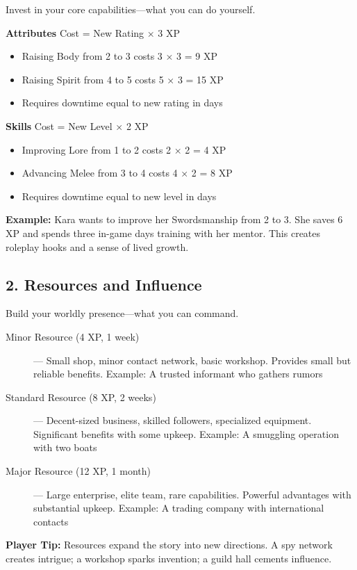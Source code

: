 \documentclass[11pt,twoside,openany]{book}
\begin{document}
Invest in your core capabilities—what you can do yourself.

\textbf{Attributes} Cost = New Rating × 3 XP
\begin{itemize}
\item Raising Body from 2 to 3 costs 3 × 3 = 9 XP
\item Raising Spirit from 4 to 5 costs 5 × 3 = 15 XP
\item Requires downtime equal to new rating in days
\end{itemize}

\textbf{Skills} Cost = New Level × 2 XP
\begin{itemize}
\item Improving Lore from 1 to 2 costs 2 × 2 = 4 XP
\item Advancing Melee from 3 to 4 costs 4 × 2 = 8 XP
\item Requires downtime equal to new level in days
\end{itemize}

\textbf{Example:} Kara wants to improve her Swordsmanship from 2 to 3. She saves 6 XP and spends three in-game days training with her mentor. This creates roleplay hooks and a sense of lived growth.

\subsection*{2. Resources and Influence}

Build your worldly presence—what you can command.

\begin{description}
\item[Minor Resource (4 XP, 1 week)] — Small shop, minor contact network, basic workshop. Provides small but reliable benefits. Example: A trusted informant who gathers rumors
\item[Standard Resource (8 XP, 2 weeks)] — Decent-sized business, skilled followers, specialized equipment. Significant benefits with some upkeep. Example: A smuggling operation with two boats
\item[Major Resource (12 XP, 1 month)] — Large enterprise, elite team, rare capabilities. Powerful advantages with substantial upkeep. Example: A trading company with international contacts
\end{description}

\textbf{Player Tip:} Resources expand the story into new directions. A spy network creates intrigue; a workshop sparks invention; a guild hall cements influence.
\end{document}
